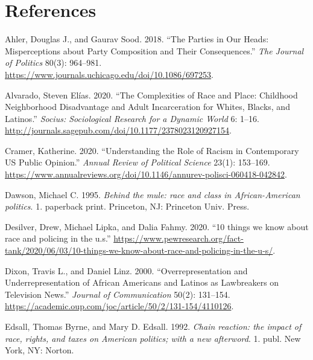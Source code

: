 \documentclass[
  12pt,
]{article}
\newlength{\cslhangindent}
\newlength{\cslentryspacingunit} %
\newenvironment{CSLReferences}[2] %
 {%
  \setlength{\parindent}{0pt}
  \ifodd #1
  \let\oldpar\par
  \def\par{\hangindent=\cslhangindent\oldpar}
  \fi
  \setlength{\parskip}{#2\cslentryspacingunit}
 }%
 {}
\begin{document}
\hypertarget{references}{%
\section*{References}\label{references}}

\hypertarget{refs}{}
\begin{CSLReferences}{1}{0}
\leavevmode{}%
Ahler, Douglas J., and Gaurav Sood. 2018. {``The Parties in Our Heads:
Misperceptions about Party Composition and Their Consequences.''}
\emph{The Journal of Politics} 80(3): 964--981.
\url{https://www.journals.uchicago.edu/doi/10.1086/697253}.

\leavevmode{}%
Alvarado, Steven Elías. 2020. {``The Complexities of Race and Place:
Childhood Neighborhood Disadvantage and Adult Incarceration for Whites,
Blacks, and Latinos.''} \emph{Socius: Sociological Research for a
Dynamic World} 6: 1--16.
\url{http://journals.sagepub.com/doi/10.1177/2378023120927154}.

\leavevmode{}%
Cramer, Katherine. 2020. {``Understanding the Role of Racism in
Contemporary US Public Opinion.''} \emph{Annual Review of Political
Science} 23(1): 153--169.
\url{https://www.annualreviews.org/doi/10.1146/annurev-polisci-060418-042842}.

\leavevmode{}%
Dawson, Michael C. 1995. \emph{Behind the mule: race and class in
African-American politics}. 1. paperback print. Princeton, NJ: Princeton
Univ. Press.

\leavevmode{}%
Desilver, Drew, Michael Lipka, and Dalia Fahmy. 2020. {``10 things we
know about race and policing in the u.s.''}
\url{https://www.pewresearch.org/fact-tank/2020/06/03/10-things-we-know-about-race-and-policing-in-the-u-s/}.

\leavevmode{}%
Dixon, Travis L., and Daniel Linz. 2000. {``Overrepresentation and
Underrepresentation of African Americans and Latinos as Lawbreakers on
Television News.''} \emph{Journal of Communication} 50(2): 131--154.
\url{https://academic.oup.com/joc/article/50/2/131-154/4110126}.

\leavevmode{}%
Edsall, Thomas Byrne, and Mary D. Edsall. 1992. \emph{Chain reaction:
the impact of race, rights, and taxes on American politics; with a new
afterword}. 1. publ. New York, NY: Norton.


\end{CSLReferences}
\end{document}
